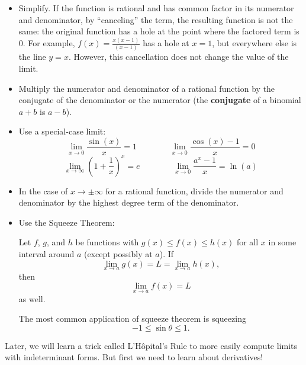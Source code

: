 \begin{itemize}
\item Simplify. If the function is rational and has common factor in its numerator and denominator, by ``canceling'' the term, the resulting function is not the same: the original function has a hole at the point where the factored term is 0. For example, $f(x)=\frac{x(x-1)}{(x-1)}$ has a hole at $x=1$, but everywhere else is the line $y=x$. However, this cancellation does not change the value of the limit.
\item Multiply the numerator and denominator of a rational function by the conjugate of the denominator or the numerator (the \textbf{conjugate} of a binomial $a+b$ is $a-b$).
\item Use a special-case limit: 
$$
\lim_{x\to 0}\frac{\sin(x)}{x} = 1
\quad\quad\quad\quad
\lim_{x\to 0}\frac{\cos(x) - 1}{x} = 0
$$
$$
\lim_{x\to\infty}\left(1+\frac{1}{x}\right)^x = e
\quad\quad\quad\quad
\lim_{x\to 0}\frac{a^x-1}{x}=\ln(a)
$$

\item In the case of $x\to\pm\infty$ for a rational function, divide the numerator and denominator by the highest degree term of the denominator.

\item Use the Squeeze Theorem:

\begin{thm}
Let $f$, $g$, and $h$ be functions with $g(x)\leq f(x)\leq h(x)$ for all $x$ in some interval around $a$ (except possibly at $a$). If $$\lim_{x\to a}g(x)=L=\lim_{x\to a} h(x),$$ then $$\lim_{x\to a} f(x)=L$$
as well.
\end{thm}
The most common application of squeeze theorem is squeezing $$-1\leq \sin\theta \leq 1.$$

\end{itemize}

Later, we will learn a trick called L'H\^opital's Rule to more easily compute limits with indeterminant forms. But first we need to learn about derivatives!












